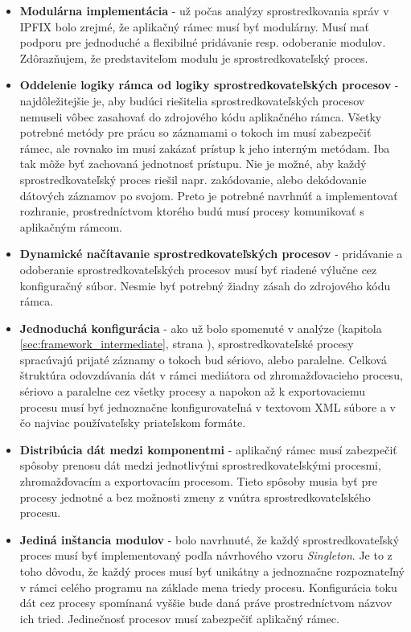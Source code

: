 \begin{itemize}
 \item \textbf{Modulárna implementácia} - už počas analýzy sprostredkovania správ v IPFIX bolo zrejmé, že 
 aplikačný rámec musí byť modulárny. Musí mať podporu pre jednoduché a flexibilné pridávanie resp. 
 odoberanie modulov. Zdôrazňujem, že predstaviteľom modulu je sprostredkovateľský proces.
 
  \item \textbf{Oddelenie logiky rámca od logiky sprostredkovateľských procesov} - 
  najdôležitejšie je, aby budúci riešitelia sprostredkovateľských procesov nemuseli vôbec zasahovať 
  do zdrojového kódu aplikačného rámca. Všetky potrebné metódy pre prácu so záznamami o tokoch 
  im musí zabezpečiť rámec, ale rovnako im musí zakázať prístup k jeho interným metódam. 
  Iba tak môže byť zachovaná jednotnosť prístupu. Nie je možné, aby každý sprostredkovateľský proces 
  riešil napr. zakódovanie, alebo dekódovanie dátových záznamov po svojom. Preto je potrebné navrhnúť 
  a implementovať rozhranie, prostredníctvom ktorého budú musí  procesy komunikovať s aplikačným rámcom.
  
 \item \textbf{Dynamické načítavanie sprostredkovateľských procesov} - pridávanie a odoberanie 
 sprostredkovateľských procesov musí byť riadené výlučne cez konfiguračný súbor. Nesmie byť potrebný 
 žiadny zásah do zdrojového kódu  rámca.
 
 \item \textbf{Jednoduchá konfigurácia} - ako už bolo spomenuté v analýze 
 (kapitola \ref{sec:framework_intermediate}, strana \pageref{sec:framework_intermediate}), 
 sprostredkovateľské procesy spracúvajú prijaté záznamy o tokoch bud sériovo, alebo paralelne. 
 Celková štruktúra odovzdávania dát v rámci mediátora od zhromažďovacieho procesu, sériovo a paralelne cez 
 všetky procesy a napokon až k exportovaciemu procesu musí byť jednoznačne konfigurovateľná v textovom 
 XML súbore a v čo najviac používateľsky priateľskom formáte. 
 
 \item \textbf{Distribúcia dát medzi komponentmi} - aplikačný rámec musí zabezpečiť spôsoby prenosu dát medzi 
 jednotlivými sprostredkovateľskými procesmi, zhromažďovacím a exportovacím procesom. Tieto spôsoby 
 musia byť pre procesy jednotné a bez možnosti zmeny z vnútra sprostredkovateľského procesu.
 
 \item \textbf{Jediná inštancia modulov} - bolo navrhnuté, že každý sprostredkovateľský
 proces musí byť implementovaný podľa návrhového vzoru \emph{Singleton}. Je to z toho dôvodu, že 
 každý proces musí byť unikátny a jednoznačne rozpoznateľný v rámci celého programu na 
 základe mena triedy procesu. Konfigurácia toku dát cez procesy spomínaná vyššie bude daná práve 
 prostredníctvom názvov ich tried. Jedinečnosť procesov musí zabezpečiť aplikačný rámec. 
 

\end{itemize}
